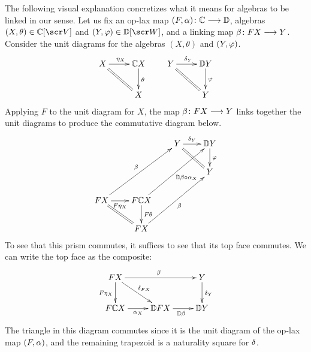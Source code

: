 \documentclass{amsart}
\theoremstyle{definition}
\begin{document}
The following visual explanation concretizes what it means for algebras to be linked in our sense. Let us fix an op-lax map $(F,\alpha) \colon \mathbb{C} \longrightarrow \mathbb{D}$, algebras $(X,\tha) \in \bC[\sV]$ and $(Y,\phz) \in \bD[\sW]$, and a linking map $\beta \colon FX \longrightarrow Y$. Consider the unit diagrams for the 
algebras $(X,\theta)$ and $(Y,\varphi)$.
\[
\xymatrix{
    X \ar[r]^{\et_X} \ar@{=}[dr] & \bC X \ar[d]^{\theta}\\
    & X
} \qquad
\xymatrix{
    Y \ar[r]^{\de_Y} \ar@{=}[dr] & \bD Y \ar[d]^{\phz}\\
    & Y
}
\]
\noindent Applying $F$ to the unit diagram for $X$, the map $\beta \colon FX \longrightarrow Y$ links together the unit diagrams to produce the commutative diagram below.
\[
\xymatrix@-0.25pc{
    & & Y \ar[r]^-{\de_Y} \ar@{=}[dr] & \bD Y \ar[d]^{\phz}\\
    & & & Y \\
    FX \ar[uurr]^{\be} \ar[r]_-{F\et_X} \ar@{=}[dr] & F \bC X \ar[uurr]_{\bD \be \circ \al_X} \ar[d]^-{F\theta} & &\\
    & FX \ar[uurr]_{\be} & &
}
\]
\noindent To see that this prism commutes, it suffices to see that its top face commutes. We can write the top face as the composite:
\[
\xymatrix{
    FX \ar[d]_{F\et_X} \ar[rr]^{\be} \ar[dr]^{\de_{FX}} & & Y \ar[d]^{\de_Y} \\
    F \bC X \ar[r]_{\al_X} & \bD FX \ar[r]_{\bD \be} & \bD Y
}
\]
\noindent The triangle in this diagram commutes since it is the unit diagram of the op-lax map $(F,\alpha)$, and the remaining trapezoid is a naturality square for $\delta$.\\
\end{document}

